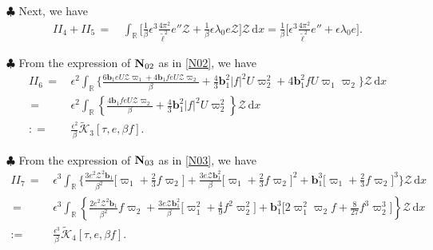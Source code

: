 \documentclass[10pt, reqno]{amsart}
\numberwithin{equation}{section}
\theoremstyle{definition}
\begin{document}
{\smallskip\noindent $\clubsuit$
Next, we have
\begin{align} \label{main term mathccal Z}
 II_{4}+II_{5}\,=\,& \int_{{\mathbb R}} \Bigg[\frac 1\beta\epsilon^3\frac{4\pi^2}{{\tilde\ell}^2} e''\mathcal Z
 +\frac 1\beta \epsilon\lambda_0 e{\mathcal Z} \Bigg] {\mathcal Z} \,{\mathrm d}x
 = \frac {1}\beta \Bigg[\epsilon^3\frac{4\pi^2}{{\tilde\ell}^2} e'' + \epsilon\lambda_0 e \Bigg].
\end{align}

\smallskip\noindent $\clubsuit$
 From the expression of ${\bf N}_{02}$ as in \eqref{N02}, we have
\begin{align}\label{ESTIMATEII6}
II_{6}
 \,=\,
&\epsilon^2\int_{{\mathbb R}}\Bigg\{\frac{6 {\mathbf b}_1e U{\mathcal Z}\varpi_1
+4 {\mathbf b}_1fe U{\mathcal Z} \varpi_2}\beta
+\frac{4}{3}{\mathbf b}_1^2|f|^2 U\varpi_2^2
+ 4{\mathbf b}_1^2f U\varpi_1\varpi_2\Bigg\}{\mathcal Z} \,{\mathrm d}x
\nonumber\\[2mm]
 \,=\,& \epsilon^2\int_{{\mathbb R}} \left\{ \frac{4 {\mathbf b}_1fe U{\mathcal Z} \varpi_2}\beta +\frac{4}{3}{\mathbf b}_1^2|f|^2 U\varpi_2^2\right\} {\mathcal Z} \,{\mathrm d}x
\nonumber\\[2mm]
 : =\,&
\frac{\epsilon^2}{\beta}\tilde{\mathcal K}_3\left[\tau, e, {\beta f}\right].
\end{align}

\smallskip\noindent $\clubsuit$
 From the expression of ${\bf N}_{03}$ as in \eqref{N03}, we have
\begin{align}\label{nonlinear term w1 emathcal Z}
II_{7}
 \,=\,
&\epsilon^3\int_{{\mathbb R}}\Bigg\{\frac{3 e^2\mathcal Z^2 {\mathbf b}_1}{\beta^2}\Big[\varpi_1 + \frac{2}{3}f \varpi_2\Big]
+ \frac{3 e{\mathcal Z} {\mathbf b}_1^2}{\beta}\Big[\varpi_1 + \frac{2}{3}f \varpi_2\Big]^2
+ {\mathbf b}_1^3\Big[\varpi_1 + \frac{2}{3}f \varpi_2\Big]^3 \Bigg\}{\mathcal Z} \,{\mathrm d}x
\nonumber\\[2mm]
 \,=\,& \epsilon^3\int_{{\mathbb R}} \left\{ \frac{2 e^2\mathcal Z^2 {\mathbf b}_1}{\beta^2} f \varpi_2 + \frac{3 e{\mathcal Z} {\mathbf b}_1^2}{\beta}\Big[\varpi_1^2 + \frac{4}{9}f^2 \varpi_2^2\Big] + {\mathbf b}_1^3\Big[ 2 \varpi_1^2 \varpi_2 f + \frac8{27} f^3 \varpi_2^3\Big] \right\} {\mathcal Z} \,{\mathrm d}x
\nonumber\\[2mm]
:=\,&
\frac{\epsilon^3}{\beta}\tilde{\mathcal K}_4\left[\tau, e, {\beta f}\right].
\end{align}





}
\end{document}
